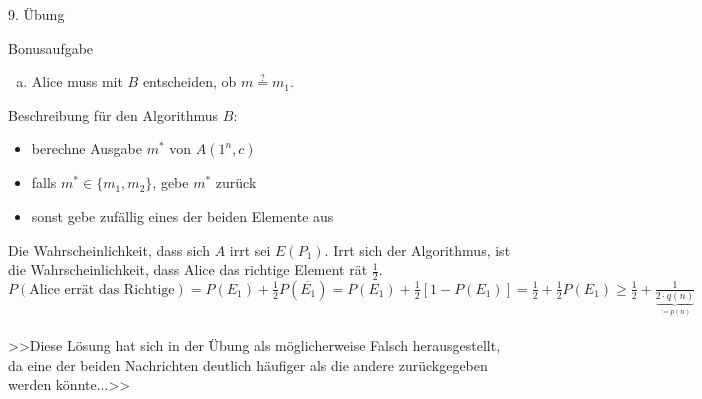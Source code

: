 \begin{section}{9. Übung}
\begin{subsection}{Bonusaufgabe}
\begin{enumerate}[a)]
   \item Alice muss mit $B$ entscheiden, ob $m \overset{?}{=} m_1$.
  \end{enumerate}
  Beschreibung für den Algorithmus $B$:
  \begin{itemize}
   \item berechne Ausgabe $m^*$ von $A(1^n,c)$
   \item falls $m^* \in \{m_1, m_2\}$, gebe $m^*$ zurück
   \item sonst gebe zufällig eines der beiden Elemente aus
  \end{itemize}
  Die Wahrscheinlichkeit, dass sich $A$ irrt sei $E(P_1)$. Irrt sich der Algorithmus, ist die Wahrscheinlichkeit, dass Alice das richtige Element rät $\frac{1}{2}$.\\
  $P(\text{Alice errät das Richtige}) = P(E_1) + \frac{1}{2} P(\overline{E_1}) = P(E_1) + \frac{1}{2}[1- P(E_1)] = \frac{1}{2} + \frac{1}{2} P(E_1) \geq \frac{1}{2} + \frac{1}{\underbrace{2\cdot q(n)}_{:= p(n)}}$\\ \\
  >>Diese Lösung hat sich in der Übung als möglicherweise Falsch herausgestellt, da eine der beiden Nachrichten deutlich häufiger als die andere zurückgegeben werden könnte...>>
 \end{subsection}
\end{section}
